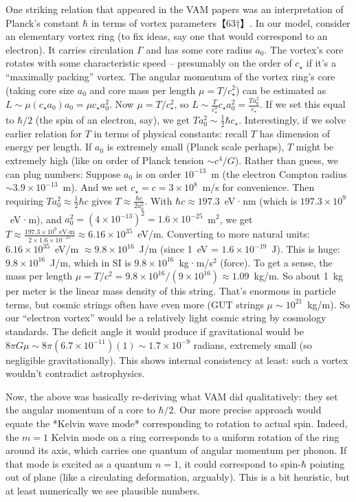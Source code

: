 \documentclass[12pt]{article}
\begin{document}
One striking relation that appeared in the VAM papers was an interpretation of Planck’s constant $\hbar$ in terms of vortex parameters【63†】. In our model, consider an elementary vortex ring (to fix ideas, say one that would correspond to an electron). It carries circulation $\Gamma$ and has some core radius $a_0$. The vortex’s core rotates with some characteristic speed – presumably on the order of $c_\star$ if it’s a “maximally packing” vortex. The angular momentum of the vortex ring’s core (taking core size $a_0$ and core mass per length $\mu = T/c_\star^2$) can be estimated as $L \sim \mu (c_\star a_0) a_0 = \mu c_\star a_0^2$. Now $\mu = T/c_\star^2$, so $L \sim \frac{T}{c_\star^2} c_\star a_0^2 = \frac{T a_0^2}{c_\star}$. If we set this equal to $\hbar/2$ (the spin of an electron, say), we get $T a_0^2 \sim \frac{1}{2} \hbar c_\star$. Interestingly, if we solve earlier relation for $T$ in terms of physical constants: recall $T$ has dimension of energy per length. If $a_0$ is extremely small (Planck scale perhaps), $T$ might be extremely high (like on order of Planck tension $\sim c^4/G$). Rather than guess, we can plug numbers: Suppose $a_0$ is on order $10^{-13}$ m (the electron Compton radius $\sim 3.9\times10^{-13}$ m). And we set $c_\star = c = 3\times10^8$ m/s for convenience. Then requiring $T a_0^2 \approx \frac{1}{2}\hbar c$ gives $T \approx \frac{\hbar c}{2 a_0^2}$. With $\hbar c \approx 197.3$ eV·nm (which is $197.3 \times 10^9$ eV·m), and $a_0^2 = (4\times10^{-13})^2 = 1.6\times10^{-25}$ m$^2$, we get $T \approx \frac{197.3\times10^9 \text{ eV·m}}{2 \times 1.6\times10^{-25}} \approx 6.16\times10^{35}$ eV/m. Converting to more natural units: $6.16\times10^{35}$ eV/m $\approx 9.8\times10^{16}$ J/m (since 1 eV = $1.6\times10^{-19}$ J). This is huge: $9.8\times10^{16}$ J/m, which in SI is $9.8\times10^{16}$ kg·m/s$^2$ (force). To get a sense, the mass per length $\mu = T/c^2 = 9.8\times10^{16}/(9\times10^{16}) \approx 1.09$ kg/m. So about 1 kg per meter is the linear mass density of this string. That’s enormous in particle terms, but cosmic strings often have even more (GUT strings $\mu \sim 10^{21}$ kg/m). So our “electron vortex” would be a relatively light cosmic string by cosmology standards. The deficit angle it would produce if gravitational would be $8\pi G \mu \sim 8\pi(6.7\times10^{-11})(1) \sim 1.7\times10^{-9}$ radians, extremely small (so negligible gravitationally). This shows internal consistency at least: such a vortex wouldn’t contradict astrophysics. 

Now, the above was basically re-deriving what VAM did qualitatively: they set the angular momentum of a core to $\hbar/2$. Our more precise approach would equate the *Kelvin wave mode* corresponding to rotation to actual spin. Indeed, the $m=1$ Kelvin mode on a ring corresponds to a uniform rotation of the ring around its axis, which carries one quantum of angular momentum per phonon. If that mode is excited as a quantum $n=1$, it could correspond to spin-$\hbar$ pointing out of plane (like a circulating deformation, arguably). This is a bit heuristic, but at least numerically we see plausible numbers. 
\end{document}
